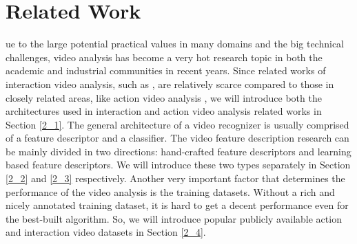 %
%
\let\textcircled=\pgftextcircled
\chapter{Related Work}
\label{chap2}

ue to the large potential practical values in many domains and the big technical challenges, video analysis has become a very hot research topic in both the academic and industrial communities in recent years. Since related works of interaction video analysis, such as \cite{patron2010} \cite{Gemeren2015} \cite{narayan2014} \cite{choi2012}, are relatively scarce compared to those in closely related areas, like action video analysis \cite{Ji2013} \cite{Ng2015} \cite{Tran2015} \cite{alex2008} \cite{grepory2010} \cite{karpathy2014} \cite{simonyan2014}, we will introduce both the architectures used in interaction and action video analysis related works in Section \ref{2_1}. The general architecture of a video recognizer is usually comprised of a feature descriptor and a classifier. The video feature description research can be mainly divided in two directions: hand-crafted feature descriptors and learning based feature descriptors. We will introduce these two types separately in Section \ref{2_2} and \ref{2_3} respectively. Another very important factor that determines the performance of the video analysis is the training datasets. Without a rich and nicely annotated training dataset, it is hard to get a decent performance even for the best-built algorithm. So, we will introduce popular publicly available action and interaction video datasets in Section \ref{2_4}.

